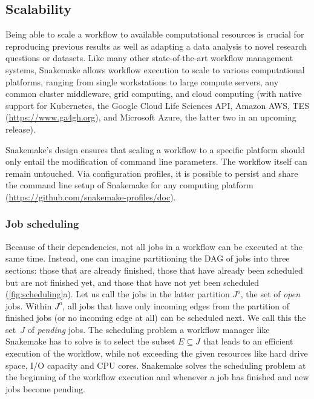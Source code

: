\documentclass[10pt,a4paper,twocolumn]{article}
\let\plainurl\url
\renewcommand{\url}[1]{\protect\plainurl{#1}}
\begin{document}
\subsection{Scalability}\label{sec:scalability}

Being able to scale a workflow to available computational resources is crucial for reproducing previous results as well as adapting a data analysis to novel research questions or datasets.
Like many other state-of-the-art workflow management systems, Snakemake allows workflow execution to scale to various computational platforms, ranging from single workstations to large compute servers, any common cluster middleware, grid computing, and cloud computing (with native support for Kubernetes, the Google Cloud Life Sciences API, Amazon AWS, TES (\url{https://www.ga4gh.org}), and Microsoft Azure, the latter two in an upcoming release).

Snakemake's design ensures that scaling a workflow to a specific platform should only entail the modification of command line parameters.
The workflow itself can remain untouched.
Via configuration profiles, it is possible to persist and share the command line setup of Snakemake for any computing platform (\url{https://github.com/snakemake-profiles/doc}).


\subsubsection{Job scheduling}
\label{sec:scheduling}

Because of their dependencies, not all jobs in a workflow can be executed at the same time.
Instead, one can imagine partitioning the DAG of jobs into three sections: 
those that are already finished,
those that have already been scheduled but are not finished yet,
and those that have not yet been scheduled (\autoref{fig:scheduling}a).
Let us call the jobs in the latter partition $J^o$, the set of \emph{open} jobs.
Within $J^o$, all jobs that have only incoming edges from the partition of finished jobs (or no incoming edge at all) can be scheduled next.
We call this the set~$J$ of \emph{pending} jobs.
The scheduling problem a workflow manager like Snakemake has to solve is to select the subset $E \subseteq J$ that leads to an efficient execution of the workflow, while not exceeding the given resources like hard drive space, I/O capacity and CPU cores.
Snakemake solves the scheduling problem at the beginning of the workflow execution and whenever a job has finished and new jobs become pending.
\end{document}
